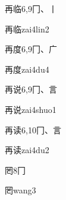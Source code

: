 \begin{entry}{再临}{6,9}{⼌、⼁}
  \begin{phonetics}{再临}{zai4lin2}
  \end{phonetics}
\end{entry}

\begin{entry}{再度}{6,9}{⼌、⼴}
  \begin{phonetics}{再度}{zai4du4}
  \end{phonetics}
\end{entry}

\begin{entry}{再说}{6,9}{⼌、⾔}
  \begin{phonetics}{再说}{zai4shuo1}
  \end{phonetics}
\end{entry}

\begin{entry}{再读}{6,10}{⼌、⾔}
  \begin{phonetics}{再读}{zai4du2}
  \end{phonetics}
\end{entry}

\begin{entry}{罔}{8}{⼌}
  \begin{phonetics}{罔}{wang3}
  \end{phonetics}
\end{entry}



